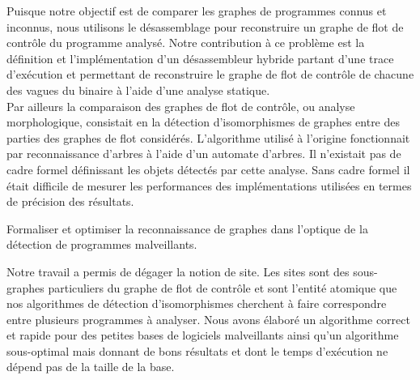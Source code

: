 Puisque notre objectif est de comparer les graphes de programmes connus et inconnus, nous utilisons le désassemblage pour reconstruire un graphe de flot de contrôle du programme analysé.
Notre contribution à ce problème est la définition et l'implémentation d'un désassembleur hybride partant d'une trace d'exécution et permettant de reconstruire le graphe de flot de contrôle de chacune des vagues du binaire à l'aide d'une analyse statique.
\\ 

Par ailleurs la comparaison des graphes de flot de contrôle, ou analyse morphologique, consistait en la détection d'isomorphismes de graphes entre des parties des graphes de flot considérés. 
L'algorithme utilisé à l'origine fonctionnait par reconnaissance d'arbres à l'aide d'un automate d'arbres. Il n'existait pas de cadre formel définissant les objets détectés par cette analyse. Sans cadre formel il était difficile de mesurer les performances des implémentations utilisées en termes de précision des résultats.

\begin{pbb}
 Formaliser et optimiser la reconnaissance de graphes dans l'optique de la détection de programmes malveillants.
\end{pbb}

Notre travail a permis de dégager la notion de site. Les sites sont des sous-graphes particuliers du graphe de flot de contrôle et sont l'entité atomique que nos algorithmes de détection d'isomorphismes cherchent à faire correspondre entre plusieurs programmes à analyser. Nous avons élaboré un algorithme correct et rapide pour des petites bases de logiciels malveillants ainsi qu'un algorithme sous-optimal mais donnant de bons résultats et dont le temps d'exécution ne dépend pas de la taille de la base.

